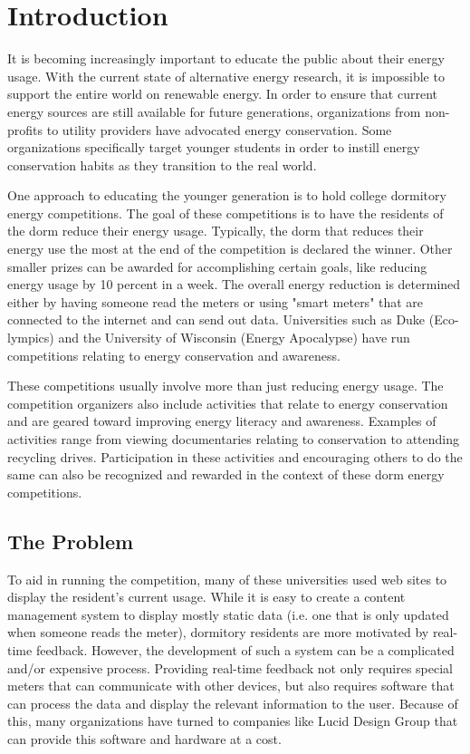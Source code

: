 
\chapter{Introduction}
It is becoming increasingly important to educate the public about their energy usage.  With the current state of alternative energy research, it is impossible to support the entire world on renewable energy.  In order to ensure that current energy sources are still available for future generations, organizations from non-profits to utility providers have advocated energy conservation.  Some organizations specifically target younger students in order to instill energy conservation habits as they transition to the real world.

One approach to educating the younger generation is to hold college dormitory energy competitions.  The goal of these competitions is to have the residents of the dorm reduce their energy usage.  Typically, the dorm that reduces their energy use the most at the end of the competition is declared the winner.  Other smaller prizes can be awarded for accomplishing certain goals, like reducing energy usage by 10 percent in a week.  The overall energy reduction is determined either by having someone read the meters or using "smart meters" that are connected to the internet and can send out data.  Universities such as Duke (Eco-lympics) and the University of Wisconsin (Energy Apocalypse) have run competitions relating to energy conservation and awareness. 

These competitions usually involve more than just reducing energy usage.  The competition organizers also include activities that relate to energy conservation and are geared toward improving energy literacy and awareness.  Examples of activities range from viewing documentaries relating to conservation to attending recycling drives.  Participation in these activities and encouraging others to do the same can also be recognized and rewarded in the context of these dorm energy competitions.

\section{The Problem}

To aid in running the competition, many of these universities used web sites to display the resident's current usage.  While it is easy to create a content management system to display mostly static data (i.e. one that is only updated when someone reads the meter), dormitory residents are more motivated by real-time feedback\cite{oberlin-feedback}.  However, the development of such a system can be a complicated and/or expensive process.  Providing real-time feedback not only requires special meters that can communicate with other devices, but also requires software that can process the data and display the relevant information to the user.  Because of this, many organizations have turned to companies like Lucid Design Group that can provide this software and hardware at a cost.


